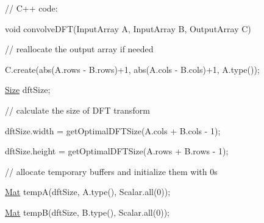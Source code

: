 {\ttfamily }

{\ttfamily }

{\ttfamily // C++ code\+:}

{\ttfamily }

{\ttfamily }

{\ttfamily void convolve\+D\+F\+T(\+Input\+Array A, Input\+Array B, Output\+Array C)}

{\ttfamily }

{\ttfamily }

{\ttfamily // reallocate the output array if needed}

{\ttfamily }

{\ttfamily }

{\ttfamily C.\+create(abs(A.\+rows -\/ B.\+rows)+1, abs(A.\+cols -\/ B.\+cols)+1, A.\+type());}

{\ttfamily }

{\ttfamily }

{\ttfamily \mbox{\hyperlink{classorg_1_1opencv_1_1core_1_1_size}{Size}} dft\+Size;}

{\ttfamily }

{\ttfamily }

{\ttfamily // calculate the size of D\+FT transform}

{\ttfamily }

{\ttfamily }

{\ttfamily dft\+Size.\+width = get\+Optimal\+D\+F\+T\+Size(A.\+cols + B.\+cols -\/ 1);}

{\ttfamily }

{\ttfamily }

{\ttfamily dft\+Size.\+height = get\+Optimal\+D\+F\+T\+Size(A.\+rows + B.\+rows -\/ 1);}

{\ttfamily }

{\ttfamily }

{\ttfamily // allocate temporary buffers and initialize them with 0\textquotesingle{}s}

{\ttfamily }

{\ttfamily }

{\ttfamily \mbox{\hyperlink{classorg_1_1opencv_1_1core_1_1_mat}{Mat}} tempA(dft\+Size, A.\+type(), Scalar.\+all(0));}

{\ttfamily }

{\ttfamily }

{\ttfamily \mbox{\hyperlink{classorg_1_1opencv_1_1core_1_1_mat}{Mat}} tempB(dft\+Size, B.\+type(), Scalar.\+all(0));}

{\ttfamily }

{\ttfamily }

